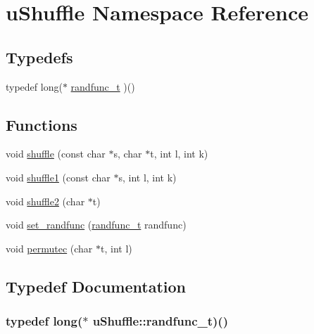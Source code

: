 \hypertarget{namespaceu_shuffle}{\section{u\+Shuffle Namespace Reference}
\label{namespaceu_shuffle}
}
\subsection*{Typedefs}
\begin{DoxyCompactItemize}
\item 
typedef long($\ast$ \hyperlink{namespaceu_shuffle_a3b089f1b2acf469c922fea2c90ca4533}{randfunc\+\_\+t} )()
\end{DoxyCompactItemize}
\subsection*{Functions}
\begin{DoxyCompactItemize}
\item 
void \hyperlink{namespaceu_shuffle_a56a75029d26fb72eb38a0507ffa81004}{shuffle} (const char $\ast$s, char $\ast$t, int l, int k)
\item 
void \hyperlink{namespaceu_shuffle_a6304bc6726442bc49c051b0866b7c204}{shuffle1} (const char $\ast$s, int l, int k)
\item 
void \hyperlink{namespaceu_shuffle_a458a8c1af77095bdac74bbe4b66f0faf}{shuffle2} (char $\ast$t)
\item 
void \hyperlink{namespaceu_shuffle_a0756dd29ebbd612e256b692e23fd12fe}{set\+\_\+randfunc} (\hyperlink{namespaceu_shuffle_a3b089f1b2acf469c922fea2c90ca4533}{randfunc\+\_\+t} randfunc)
\item 
void \hyperlink{namespaceu_shuffle_a39fe0293043edf4e375a0a2985302456}{permutec} (char $\ast$t, int l)
\end{DoxyCompactItemize}


\subsection{Typedef Documentation}
\hypertarget{namespaceu_shuffle_a3b089f1b2acf469c922fea2c90ca4533}{
\subsubsection[{randfunc\+\_\+t}]{\setlength{\rightskip}{0pt plus 5cm}typedef long($\ast$ u\+Shuffle\+::randfunc\+\_\+t)()}}\label{namespaceu_shuffle_a3b089f1b2acf469c922fea2c90ca4533}


